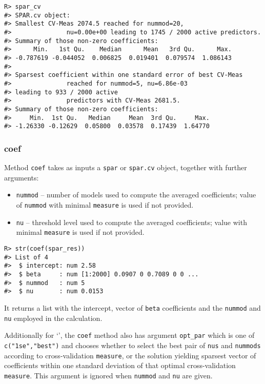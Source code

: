 \documentclass[
  article]{jss}
\newcommand{\class}[1]{`\code{#1}'}
\begin{document}
\begin{verbatim}
R> spar_cv
#> SPAR.cv object:
#> Smallest CV-Meas 2074.5 reached for nummod=20,
#>               nu=0.00e+00 leading to 1745 / 2000 active predictors.
#> Summary of those non-zero coefficients:
#>      Min.   1st Qu.    Median      Mean   3rd Qu.      Max. 
#> -0.787619 -0.044052  0.006825  0.019401  0.079574  1.086143 
#> 
#> Sparsest coefficient within one standard error of best CV-Meas
#>               reached for nummod=5, nu=6.86e-03 
#> leading to 933 / 2000 active
#>               predictors with CV-Meas 2681.5.
#> Summary of those non-zero coefficients:
#>     Min.  1st Qu.   Median     Mean  3rd Qu.     Max. 
#> -1.26330 -0.12629  0.05800  0.03578  0.17439  1.64770
\end{verbatim}

\subsubsection{coef}\label{coef}

Method \texttt{coef} takes as inputs a \texttt{spar} or \texttt{spar.cv}
object, together with further arguments:

\begin{itemize}
\item
  \texttt{nummod} -- number of models used to compute the averaged
  coefficients; value of \texttt{nummod} with minimal \texttt{measure}
  is used if not provided.
\item
  \texttt{nu} -- threshold level used to compute the averaged
  coefficients; value with minimal \texttt{measure} is used if not
  provided.
\end{itemize}

\begin{verbatim}
R> str(coef(spar_res))
#> List of 4
#>  $ intercept: num 2.58
#>  $ beta     : num [1:2000] 0.0907 0 0.7089 0 0 ...
#>  $ nummod   : num 5
#>  $ nu       : num 0.0153
\end{verbatim}

It returns a list with the intercept, vector of \texttt{beta}
coefficients and the \texttt{nummod} and \texttt{nu} employed in the
calculation.

Additionally for \class{spar.cv}, the \texttt{coef} method also has
argument \texttt{opt\_par} which is one of \texttt{c("1se","best")} and
chooses whether to select the best pair of \texttt{nus} and
\texttt{nummods} according to cross-validation \texttt{measure}, or the
solution yielding sparsest vector of coefficients within one standard
deviation of that optimal cross-validation \texttt{measure}. This
argument is ignored when \texttt{nummod} and \texttt{nu} are given.
\end{document}
